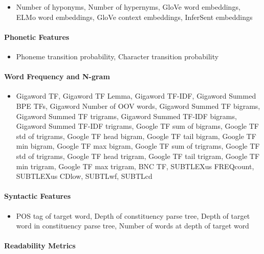 \documentclass[11pt,a4paper]{article}
\begin{document}
\begin{itemize}
  \item Number of hyponyms, Number of hypernyms, GloVe word embeddings, ELMo word embeddings, GloVe context embeddings, InferSent embeddings 
\end{itemize}

\paragraph{Phonetic Features}

\begin{itemize}
  \item Phoneme transition probability, Character transition probability
\end{itemize}

\paragraph{Word Frequency and N-gram}

\begin{itemize}
  \item Gigaword TF, Gigaword TF Lemma, Gigaword TF-IDF, Gigaword Summed BPE TFs, Gigaword Number of OOV words, Gigaword Summed TF bigrams, Gigaword Summed TF trigrams, Gigaword Summed TF-IDF bigrams, Gigaword Summed TF-IDF trigrams, Google TF sum of bigrams, Google TF std of trigrams, Google TF head bigram, Google TF tail bigram, Google TF min bigram, Google TF max bigram, Google TF sum of trigrams, Google TF std of trigrams, Google TF head trigram, Google TF tail trigram, Google TF min trigram, Google TF max trigram, BNC TF, SUBTLEXus FREQcount, SUBTLEXus CDlow, SUBTLwf, SUBTLcd
\end{itemize}

\paragraph{Syntactic Features}

\begin{itemize}
  \item POS tag of target word, Depth of constituency parse tree, Depth of target word in constituency parse tree, Number of words at depth of target word
\end{itemize}

\paragraph{Readability Metrics}
\end{document}
